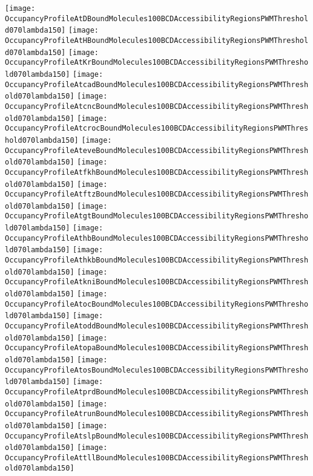 \documentclass[11pt]{article}
\begin{document}
 


\begin{center}
\texttt{[image: OccupancyProfileAtDBoundMolecules100BCDAccessibilityRegionsPWMThreshold070lambda150]}
\texttt{[image: OccupancyProfileAtHBoundMolecules100BCDAccessibilityRegionsPWMThreshold070lambda150]}
\texttt{[image: OccupancyProfileAtKrBoundMolecules100BCDAccessibilityRegionsPWMThreshold070lambda150]}
\texttt{[image: OccupancyProfileAtcadBoundMolecules100BCDAccessibilityRegionsPWMThreshold070lambda150]}
\texttt{[image: OccupancyProfileAtcncBoundMolecules100BCDAccessibilityRegionsPWMThreshold070lambda150]}
\texttt{[image: OccupancyProfileAtcrocBoundMolecules100BCDAccessibilityRegionsPWMThreshold070lambda150]}
\texttt{[image: OccupancyProfileAteveBoundMolecules100BCDAccessibilityRegionsPWMThreshold070lambda150]}
\texttt{[image: OccupancyProfileAtfkhBoundMolecules100BCDAccessibilityRegionsPWMThreshold070lambda150]}
\texttt{[image: OccupancyProfileAtftzBoundMolecules100BCDAccessibilityRegionsPWMThreshold070lambda150]}
\texttt{[image: OccupancyProfileAtgtBoundMolecules100BCDAccessibilityRegionsPWMThreshold070lambda150]}
\texttt{[image: OccupancyProfileAthbBoundMolecules100BCDAccessibilityRegionsPWMThreshold070lambda150]}
\texttt{[image: OccupancyProfileAthkbBoundMolecules100BCDAccessibilityRegionsPWMThreshold070lambda150]}
\texttt{[image: OccupancyProfileAtkniBoundMolecules100BCDAccessibilityRegionsPWMThreshold070lambda150]}
\texttt{[image: OccupancyProfileAtocBoundMolecules100BCDAccessibilityRegionsPWMThreshold070lambda150]}
\texttt{[image: OccupancyProfileAtoddBoundMolecules100BCDAccessibilityRegionsPWMThreshold070lambda150]}
\texttt{[image: OccupancyProfileAtopaBoundMolecules100BCDAccessibilityRegionsPWMThreshold070lambda150]}
\texttt{[image: OccupancyProfileAtosBoundMolecules100BCDAccessibilityRegionsPWMThreshold070lambda150]}
\texttt{[image: OccupancyProfileAtprdBoundMolecules100BCDAccessibilityRegionsPWMThreshold070lambda150]}
\texttt{[image: OccupancyProfileAtrunBoundMolecules100BCDAccessibilityRegionsPWMThreshold070lambda150]}
\texttt{[image: OccupancyProfileAtslpBoundMolecules100BCDAccessibilityRegionsPWMThreshold070lambda150]}
\texttt{[image: OccupancyProfileAttllBoundMolecules100BCDAccessibilityRegionsPWMThreshold070lambda150]}
\end{center}






\end{document}
